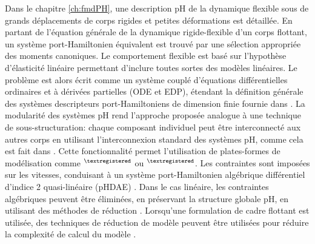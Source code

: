 Dans le chapitre \ref{ch:fmdPH},  une description pH de la dynamique flexible sous de grands déplacements de corps rigides et petites déformations est détaillée. En partant de l'équation générale de la dynamique rigide-flexible d'un corps flottant, un système port-Hamiltonien équivalent est trouvé par une sélection appropriée des moments canoniques. Le comportement flexible est basé sur l'hypothèse d'élasticité linéaire permettant d'inclure toutes sortes des modèles linéaires. Le problème est alors écrit comme un système couplé d'équations différentielles ordinaires et à dérivées partielles (ODE et EDP), étendant la définition générale des systèmes descripteurs port-Hamiltoniens de dimension finie fournie dans \cite{mehrmann2019structurepreserving}. La modularité des systèmes pH rend l'approche proposée analogue à une technique de sous-structuration: chaque composant individuel peut être interconnecté aux autres corps en utilisant l'interconnexion standard des systèmes pH, comme cela est fait dans \cite{macchelli2007link}. Cette fonctionnalité permet l'utilisation de plates-formes de modélisation comme {}$^{\tiny{\textregistered}}$ ou {}$^{\tiny{\textregistered}}$. Les contraintes sont imposées sur les vitesses, conduisant à un système port-Hamiltonien algébrique différentiel d'indice 2 quasi-linéaire (pHDAE) \cite{steinbrecher2006phd,beattie2018linear}. Dans le cas linéaire, les contraintes algébriques peuvent être éliminées, en préservant la structure globale pH, en utilisant des méthodes de réduction \cite{leyendecker2008nullspace}. Lorsqu'une formulation de cadre flottant est utilisée, des techniques de réduction de modèle peuvent être utilisées pour réduire la complexité de calcul du modèle \cite{chaturantabut2016,egger2018}. 

